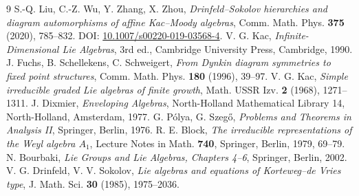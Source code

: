 \documentclass[11pt,UTF8]{ctexart}
\theoremstyle{definition}
\begin{document}
\begin{thebibliography}{9}
 S.-Q. Liu, C.-Z. Wu, Y. Zhang, X. Zhou,
\emph{Drinfeld--Sokolov hierarchies and diagram automorphisms of affine Kac--Moody algebras},
Comm. Math. Phys. \textbf{375} (2020), 785--832.
DOI: \href{https://doi.org/10.1007/s00220-019-03568-4}{10.1007/s00220-019-03568-4}.
 V. G. Kac, \emph{Infinite-Dimensional Lie Algebras}, 3rd ed.,
Cambridge University Press, Cambridge, 1990.
 J. Fuchs, B. Schellekens, C. Schweigert,
\emph{From Dynkin diagram symmetries to fixed point structures},
Comm. Math. Phys. \textbf{180} (1996), 39--97.
 V. G. Kac, \emph{Simple irreducible graded Lie algebras of finite growth},
Math. USSR Izv. \textbf{2} (1968), 1271--1311.
 J. Dixmier, \emph{Enveloping Algebras}, North-Holland Mathematical Library 14,
North-Holland, Amsterdam, 1977.
 G. P\'olya, G. Szeg\H{o}, \emph{Problems and Theorems in Analysis II},
Springer, Berlin, 1976.
 R. E. Block, \emph{The irreducible representations of the Weyl algebra $A_1$},
Lecture Notes in Math. \textbf{740}, Springer, Berlin, 1979, 69--79.
 N. Bourbaki, \emph{Lie Groups and Lie Algebras, Chapters 4--6},
Springer, Berlin, 2002.
 V. G. Drinfeld, V. V. Sokolov,
\emph{Lie algebras and equations of Korteweg--de Vries type},
J. Math. Sci. \textbf{30} (1985), 1975--2036.
\end{thebibliography}
\end{document}
